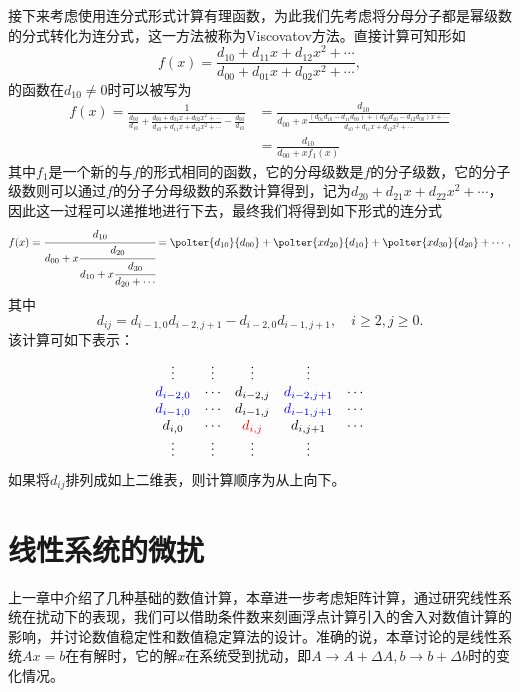 \documentclass[a4paper,10pt]{ctexart}
\begin{document}
接下来考虑使用连分式形式计算有理函数，为此我们先考虑将分母分子都是幂级数的分式转化为连分式，这一方法被称为Viscovatov方法。直接计算可知形如
\[
    f(x) = \frac{d_{10} + d_{11} x + d_{12} x^2 + \cdots}{d_{00} + d_{01} x + d_{02} x^2 + \cdots},
\]
的函数在$ d_{10}\ne 0 $时可以被写为
\[
    \begin{aligned}
        f(x) = \frac{1}{\frac{d_{00}}{d_{10}} + \frac{d_{00} + d_{01} x + d_{02} x^2 + \cdots}{d_{10} + d_{11} x + d_{12} x^2 + \cdots} - \frac{d_{00}}{d_{10}}}
        &= \frac{d_{10}}{d_{00} + x\frac{(d_{01}d_{10} - d_{11}d_{00}) + (d_{02}d_{10}-d_{12}d_{00}) x + \cdots}{d_{10} + d_{11} x + d_{12} x^2 + \cdots}}\\
        &= \frac{d_{10}}{d_{00} + xf_1(x)}
    \end{aligned}
\]
其中$ f_1 $是一个新的与$ f $的形式相同的函数，它的分母级数是$ f $的分子级数，它的分子级数则可以通过$ f $的分子分母级数的系数计算得到，记为$ d_{20} + d_{21}x + d_{22}x^2 +\cdots  $，因此这一过程可以递推地进行下去，最终我们将得到如下形式的连分式
\begin{equation}
    f(x) = \cfrac{d_{10}}{d_{00} + 
    x\cfrac{d_{20}}{d_{10} + 
    x\cfrac{d_{30}}{d_{20}+ \cdots}}} = \polter{d_{10}}{d_{00}} + \polter{xd_{20}}{d_{10}} + \polter{xd_{30}}{d_{20}} + \cdots,
\end{equation}
其中
\begin{equation}
    d_{ij} = d_{i-1,0}d_{i-2,j+1} - d_{i-2,0}d_{i-1,j+1},\quad i\geqslant 2,j\geqslant 0.
\end{equation}
该计算可如下表示：
\[
    \begin{matrix}
        \vdots & \vdots & \vdots & \vdots & \\
        \textcolor{blue}{d_{i-2,0}} & \cdots & d_{i-2,j} & \textcolor{blue}{d_{i-2,j+1}} & \cdots \\
        \textcolor{blue}{d_{i-1,0}} & \cdots & d_{i-1,j} & \textcolor{blue}{d_{i-1,j+1}} & \cdots \\
        d_{i,0} & \cdots & \textcolor{red}{d_{i,j}} & d_{i,j+1} & \cdots \\
        \vdots & \vdots & \vdots & \vdots & 
    \end{matrix}
\]
如果将$ d_{ij} $排列成如上二维表，则计算顺序为从上向下。

\section{线性系统的微扰}
上一章中介绍了几种基础的数值计算，本章进一步考虑矩阵计算，通过研究线性系统在扰动下的表现，我们可以借助条件数来刻画浮点计算引入的舍入对数值计算的影响，并讨论数值稳定性和数值稳定算法的设计。准确的说，本章讨论的是线性系统$ Ax = b $在有解时，它的解$ x $在系统受到扰动，即$ A\to A+\Delta A, b\to b+\Delta b $时的变化情况。
\end{document}
